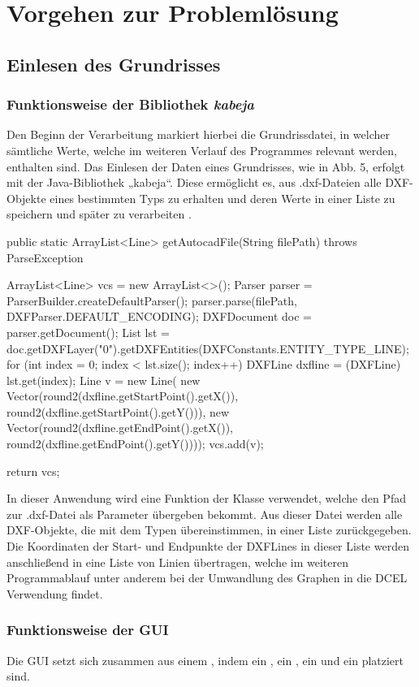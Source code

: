 \chapter{Vorgehen zur Problemlösung}
\section{Einlesen des Grundrisses}
\subsection{Funktionsweise der Bibliothek \textit{kabeja}}
Den Beginn der Verarbeitung markiert hierbei die Grundrissdatei, in welcher sämtliche Werte, welche im weiteren Verlauf des Programmes relevant werden, enthalten sind.
Das Einlesen der Daten eines Grundrisses, wie in Abb. 5, erfolgt mit der Java-Bibliothek „kabeja“. 
Diese ermöglicht es, aus .dxf-Dateien alle DXF-Objekte eines bestimmten Typs zu erhalten und deren Werte in einer Liste zu speichern und später zu verarbeiten \cite{kabeja}.
\begin{code}
public static ArrayList<Line> getAutocadFile(String filePath) throws ParseException {
	ArrayList<Line> vcs = new ArrayList<>();
	Parser parser = ParserBuilder.createDefaultParser();
	parser.parse(filePath, DXFParser.DEFAULT_ENCODING);
	DXFDocument doc = parser.getDocument();
	List lst = doc.getDXFLayer("0").getDXFEntities(DXFConstants.ENTITY_TYPE_LINE);
	for (int index = 0; index < lst.size(); index++) {
		DXFLine dxfline = (DXFLine) lst.get(index);
		Line v = new Line(
		new Vector(round2(dxfline.getStartPoint().getX()), round2(dxfline.getStartPoint().getY())),
		new Vector(round2(dxfline.getEndPoint().getX()), round2(dxfline.getEndPoint().getY())));
		vcs.add(v);
	}
	
	return vcs;
}
\end{code}
In dieser Anwendung wird eine Funktion der Klasse  verwendet, welche den Pfad zur .dxf-Datei als Parameter übergeben bekommt. 
Aus dieser Datei werden alle DXF-Objekte, die mit dem Typen  übereinstimmen, in einer Liste zurückgegeben. 
Die Koordinaten der Start- und Endpunkte der DXFLines  in dieser Liste werden anschließend in eine Liste von Linien übertragen, welche im weiteren Programmablauf unter anderem bei der Umwandlung des Graphen in die DCEL Verwendung findet.

\subsection{Funktionsweise der GUI}
Die GUI setzt sich zusammen aus einem , indem ein , ein , ein  und ein  platziert sind.

